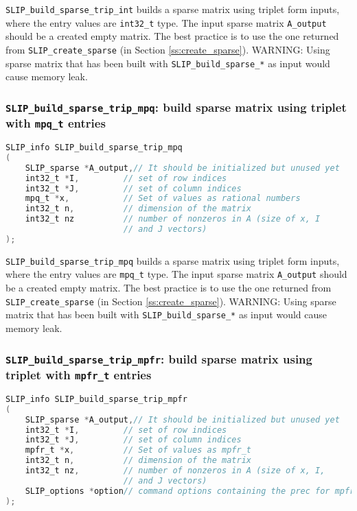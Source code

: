 \documentclass[11pt]{article}
\theoremstyle{definition}
\begin{document}
\verb|SLIP_build_sparse_trip_int| builds a sparse matrix using triplet form inputs, where the entry values are \verb|int32_t| type. The input sparse matrix \verb|A_output| should be a created empty matrix. The best practice is to use the one returned from \verb|SLIP_create_sparse| (in Section \ref{ss:create_sparse}). WARNING: Using sparse matrix that has been built with \verb|SLIP_build_sparse_*| as input would cause memory leak.

\cprotect\subsubsection{\verb|SLIP_build_sparse_trip_mpq|: build sparse matrix using triplet with \verb|mpq_t| entries}\label{s:user:build_sparse_trip_mpq}
\begin{lstlisting}[language=C,frame=single]
SLIP_info SLIP_build_sparse_trip_mpq
(
    SLIP_sparse *A_output,// It should be initialized but unused yet
    int32_t *I,         // set of row indices
    int32_t *J,         // set of column indices
    mpq_t *x,           // Set of values as rational numbers
    int32_t n,          // dimension of the matrix
    int32_t nz          // number of nonzeros in A (size of x, I
                        // and J vectors)
);
\end{lstlisting}

\verb|SLIP_build_sparse_trip_mpq| builds a sparse matrix using triplet form inputs, where the entry values are \verb|mpq_t| type. The input sparse matrix \verb|A_output| should be a created empty matrix. The best practice is to use the one returned from \verb|SLIP_create_sparse| (in Section \ref{ss:create_sparse}). WARNING: Using sparse matrix that has been built with \verb|SLIP_build_sparse_*| as input would cause memory leak.

\cprotect\subsubsection{\verb|SLIP_build_sparse_trip_mpfr|: build sparse matrix using triplet with \verb|mpfr_t| entries}\label{s:user:build_sparse_trip_mpfr}
\begin{lstlisting}[language=C,frame=single]
SLIP_info SLIP_build_sparse_trip_mpfr
(
    SLIP_sparse *A_output,// It should be initialized but unused yet
    int32_t *I,         // set of row indices
    int32_t *J,         // set of column indices
    mpfr_t *x,          // Set of values as mpfr_t
    int32_t n,          // dimension of the matrix
    int32_t nz,         // number of nonzeros in A (size of x, I,
                        // and J vectors)
    SLIP_options *option// command options containing the prec for mpfr
);
\end{lstlisting}
\end{document}
